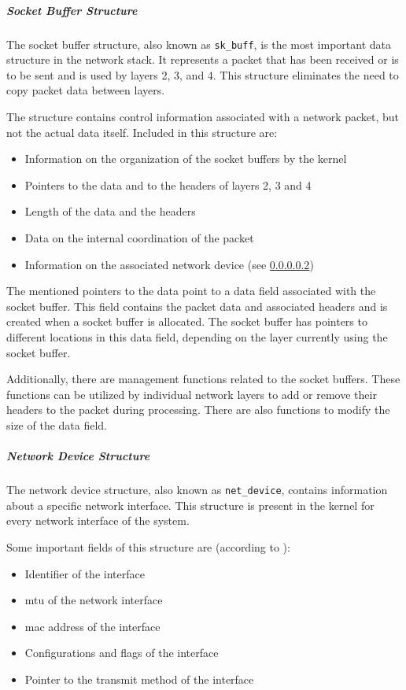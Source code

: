 \subparagraph{Socket Buffer Structure}
The socket buffer structure, also known as \texttt{sk\_buff}, is the most important data structure in the network stack. It represents a packet that has been received or is to be sent and is used by layers 2, 3, and 4. This structure eliminates the need to copy packet data between layers.

The structure contains control information associated with a network packet, but not the actual data itself. Included in this structure are:

\begin{itemize}
\item Information on the organization of the socket buffers by the kernel
\item Pointers to the data and to the headers of layers 2, 3 and 4
\item Length of the data and the headers
\item Data on the internal coordination of the packet
\item Information on the associated network device (see \ref{chap:netdevice})
\end{itemize}

The mentioned pointers to the data point to a data field associated with the socket buffer. This field contains the packet data and associated headers and is created when a socket buffer is allocated. The socket buffer has pointers to different locations in this data field, depending on the layer currently using the socket buffer.

Additionally, there are management functions related to the socket buffers. These functions can be utilized by individual network layers to add or remove their headers to the packet during processing. There are also functions to modify the size of the data field.

\subparagraph{Network Device Structure} \label{chap:netdevice}
The network device structure, also known as \texttt{net\_device}, contains information about a specific network interface. This structure is present in the kernel for every network interface of the system.

Some important fields of this structure are (according to \cite{lins01}):
\begin{itemize}
\item Identifier of the interface
\item \ac{mtu} of the network interface
\item \ac{mac} address of the interface
\item Configurations and flags of the interface
\item Pointer to the transmit method of the interface
\end{itemize}

